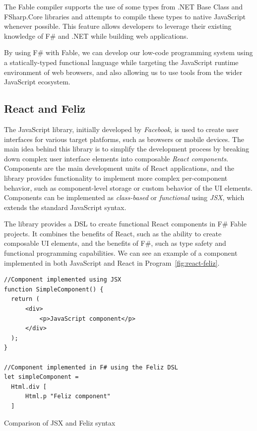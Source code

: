 The Fable compiler supports the use of some types from .NET Base Class and FSharp.Core libraries \cite{fable-comp} and attempts to compile these types to native JavaScript whenever possible.
This feature allows developers to leverage their existing knowledge of F\# and .NET while building web applications.

By using F\# with Fable, we can develop our low-code programming system using a statically-typed functional language while targeting the JavaScript runtime environment of web browsers,
and also allowing us to use tools from the wider JavaScript ecosystem.


\subsection{React and Feliz}
The \citet{react} JavaScript library, initially developed by \emph{Facebook}, is used to create user interfaces for various target platforms, such as browsers or mobile devices.
The main idea behind this library is to simplify the development process by breaking down complex user interface elements into composable \emph{React components}.
Components are the main development units of React applications, and the library provides functionality to implement more complex per-component behavior, such as component-level storage or custom behavior of the UI elements.
Components can be implemented as \emph{class-based} or \emph{functional} using \emph{JSX}, which extends the standard JavaScript syntax.

The \citet{feliz} library provides a DSL to create functional React components in F\# Fable projects.
It combines the benefits of React, such as the ability to create composable UI elements, and the benefits of F\#, such as type safety and functional programming capabilities.
We can see an example of a component implemented in both JavaScript and React in Program~\ref{fig:react-feliz}.
\begin{listing}
	\begin{center}
		\begin{lstlisting}
//Component implemented using JSX
function SimpleComponent() {
  return (
      <div>
          <p>JavaScript component</p>
      </div>
  );
} 

//Component implemented in F# using the Feliz DSL
let simpleComponent = 
  Html.div [
      Html.p "Feliz component"
  ]
  \end{lstlisting}
	\end{center}
	\caption{Comparison of JSX and Feliz syntax}
	\label{fig:react-feliz}
\end{listing}

